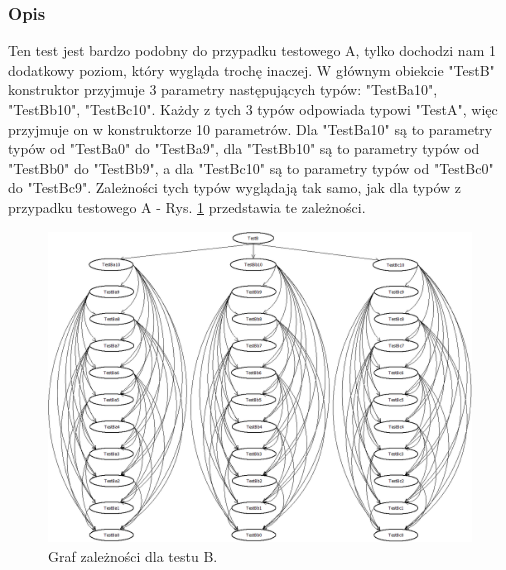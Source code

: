\documentclass[12pt]{article}
\begin{document}
\subsubsection{Opis}
Ten test jest bardzo podobny do przypadku testowego A, tylko dochodzi nam 1 dodatkowy poziom, który wygląda trochę inaczej. W głównym obiekcie "TestB" konstruktor przyjmuje 3 parametry następujących typów: "TestBa10", "TestBb10", "TestBc10". Każdy z tych 3 typów odpowiada typowi "TestA", więc przyjmuje on w konstruktorze 10 parametrów. Dla "TestBa10" są to parametry typów od "TestBa0" do "TestBa9", dla "TestBb10" są to parametry typów od "TestBb0" do "TestBb9", a dla "TestBc10" są to parametry typów od "TestBc0" do "TestBc9". Zależności tych typów wyglądają tak samo, jak dla typów z przypadku testowego A - Rys. \ref{fig:testB} przedstawia te zależności.\\
\begin{figure}[h]
	\begin{center}
  		\includegraphics[width=\linewidth]{TestB.png}
  		\caption{Graf zależności dla testu B.}
  		\label{fig:testB}
	\end{center}
\end{figure}
\end{document}
